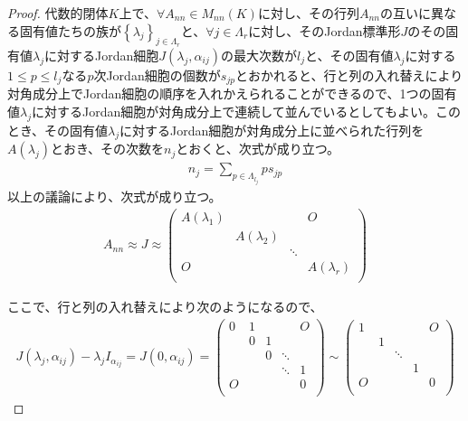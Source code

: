\documentclass[dvipdfmx]{jsarticle}
\begin{document}
\begin{proof}
代数的閉体$K$上で、$\forall A_{nn} \in M_{nn}(K)$に対し、その行列$A_{nn}$の互いに異なる固有値たちの族が$\left\{ \lambda_{j} \right\}_{j \in \varLambda_{r}}$と、$\forall j \in \varLambda_{r}$に対し、そのJordan標準形$J$のその固有値$\lambda_{j}$に対するJordan細胞$J\left( \lambda_{j},\alpha_{ij} \right)$の最大次数が$l_{j}$と、その固有値$\lambda_{j}$に対する$1 \leq p \leq l_{j}$なる$p$次Jordan細胞の個数が$s_{jp}$とおかれると、行と列の入れ替えにより対角成分上でJordan細胞の順序を入れかえられることができるので、1つの固有値$\lambda_{j}$に対するJordan細胞が対角成分上で連続して並んでいるとしてもよい。このとき、その固有値$\lambda_{j}$に対するJordan細胞が対角成分上に並べられた行列を$A\left( \lambda_{j} \right)$とおき、その次数を$n_{j}$とおくと、次式が成り立つ。
\begin{align*}
n_{j} = \sum_{p \in \varLambda_{l_{j}}} {ps_{jp}}
\end{align*}
以上の議論により、次式が成り立つ。
\begin{align*}
A_{nn} \approx J \approx \begin{pmatrix}
A\left( \lambda_{1} \right) & \  & \  & O \\
\  & A\left( \lambda_{2} \right) & \  & \  \\
\  & \  & \ddots & \  \\
O & \  & \  & A\left( \lambda_{r} \right) \\
\end{pmatrix}
\end{align*}\par
ここで、行と列の入れ替えにより次のようになるので、
\begin{align*}
J\left( \lambda_{j},\alpha_{ij} \right) - \lambda_{j}I_{\alpha_{ij}} = J\left( 0,\alpha_{ij} \right) = \begin{pmatrix}
0 & 1 & \  & \  & O \\
\  & 0 & 1 & \  & \  \\
\  & \  & 0 & \ddots & \  \\
\  & \  & \  & \ddots & 1 \\
O & \  & \  & \  & 0 \\
\end{pmatrix} \sim \begin{pmatrix}
1 & \  & \  & \  & O \\
\  & 1 & \  & \  & \  \\
\  & \  & \ddots & \  & \  \\
\  & \  & \  & 1 & \  \\
O & \  & \  & \  & 0 \\

\end{pmatrix}
\end{align*}
\end{proof}
\end{document}
